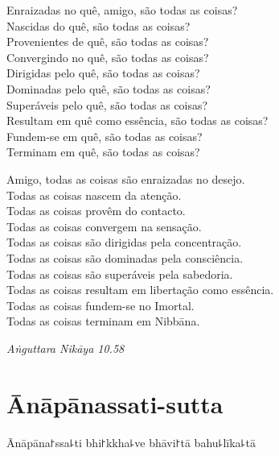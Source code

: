 \begin{english}
  Enraizadas no quê, amigo, são todas as coisas?\\
  Nascidas do quê, são todas as coisas?\\
  Provenientes de quê, são todas as coisas?\\
  Convergindo no quê, são todas as coisas?\\
  Dirigidas pelo quê, são todas as coisas?\\
  Dominadas pelo quê, são todas as coisas?\\
  Superáveis pelo quê, são todas as coisas?\\
  Resultam em quê como essência, são todas as coisas?\\
  Fundem-se em quê, são todas as coisas?\\
  Terminam em quê, são todas as coisas?

  \bigskip

  Amigo, todas as coisas são enraizadas no desejo.\\
  Todas as coisas nascem da atenção.\\
  Todas as coisas provêm do contacto.\\
  Todas as coisas convergem na sensação.\\
  Todas as coisas são dirigidas pela concentração.\\
  Todas as coisas são dominadas pela consciência.\\
  Todas as coisas são superáveis pela sabedoria.\\
  Todas as coisas resultam em libertação como essência.\\
  Todas as coisas fundem-se no Imortal.\\
  Todas as coisas terminam em Nibbāna.

\end{english}

{\raggedleft
  \emph{Aṅguttara Nikāya 10.58}
\par}

\chapter{Ānāpānassati-sutta}


\begin{leader}
\end{leader}

Ānāpāna꜓ssa꜕ti bhi꜓kkha꜕ve bhāvi꜓tā bahu꜕līka꜕tā

